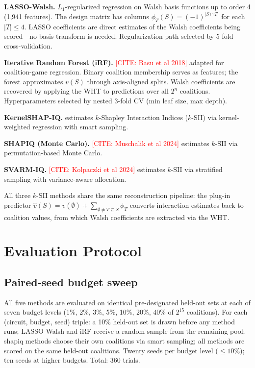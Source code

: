 \documentclass[11pt]{article}
\newcommand{\citeneeded}[1]{\textcolor{red}{[CITE: #1]}}
\begin{document}
\textbf{LASSO-Walsh.}
$L_1$-regularized regression on Walsh basis functions up to order 4
(1{,}941 features). The design matrix has columns
$\phi_T(S) = (-1)^{|S \cap T|}$ for each $|T| \leq 4$. LASSO
coefficients are direct estimates of the Walsh coefficients being
scored---no basis transform is needed. Regularization path selected
by 5-fold cross-validation.

\textbf{Iterative Random Forest (iRF).}
\citeneeded{Basu et al 2018} adapted for coalition-game regression.
Binary coalition membership serves as features; the forest
approximates $v(S)$ through axis-aligned splits. Walsh coefficients
are recovered by applying the WHT to predictions over all $2^n$
coalitions. Hyperparameters selected by nested 3-fold CV (min leaf
size, max depth).

\textbf{KernelSHAP-IQ.}
\citet{fumagalli2024kernelshapiq} estimates $k$-Shapley Interaction
Indices ($k$-SII) \citep{bordt2023shapley, grabisch1997korder} via
kernel-weighted regression with smart sampling.

\textbf{SHAPIQ (Monte Carlo).}
\citeneeded{Muschalik et al 2024} estimates $k$-SII via
permutation-based Monte Carlo.

\textbf{SVARM-IQ.}
\citeneeded{Kolpaczki et al 2024} estimates $k$-SII via stratified
sampling with variance-aware allocation.

All three $k$-SII methods share the same reconstruction pipeline:
the plug-in predictor
$\hat{v}(S) = v(\emptyset) + \sum_{\emptyset \neq T \subseteq S} \phi_T$
converts interaction estimates back to coalition values, from which
Walsh coefficients are extracted via the WHT.


\section{Evaluation Protocol}
\label{sec:protocol}

\subsection{Paired-seed budget sweep}

All five methods are evaluated on identical pre-designated held-out
sets at each of seven budget levels (1\%, 2\%, 3\%, 5\%, 10\%, 20\%,
40\% of $2^{15}$ coalitions). For each (circuit, budget, seed) triple:
a 10\% held-out set is drawn before any method runs; LASSO-Walsh and
iRF receive a random sample from the remaining pool; shapiq methods
choose their own coalitions via smart sampling; all methods are scored
on the same held-out coalitions. Twenty seeds per budget level
($\leq 10\%$); ten seeds at higher budgets. Total: 360 trials.
\end{document}
